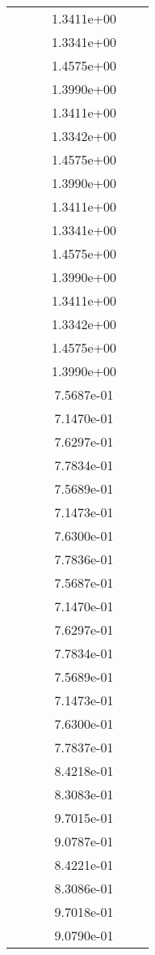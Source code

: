 \begin{xltabular}{\textwidth}{r|rS[table-format=1.3e+2]S[table-format=1.4e+2]S[table-format=1.4e+2]S[table-format=-1.5]}
&  &  & 1.3411e+00 & & \\
&  &  & 1.3341e+00 & & \\
&  &  & 1.4575e+00 & & \\
&  &  & 1.3990e+00 & & \\
&  &  & 1.3411e+00 & & \\
&  &  & 1.3342e+00 & & \\
&  &  & 1.4575e+00 & & \\
&  &  & 1.3990e+00 & & \\
&  &  & 1.3411e+00 & & \\
&  &  & 1.3341e+00 & & \\
&  &  & 1.4575e+00 & & \\
&  &  & 1.3990e+00 & & \\
&  &  & 1.3411e+00 & & \\
&  &  & 1.3342e+00 & & \\
&  &  & 1.4575e+00 & & \\
&  &  & 1.3990e+00 & & \\
&  &  & 7.5687e-01 & & \\
&  &  & 7.1470e-01 & & \\
&  &  & 7.6297e-01 & & \\
&  &  & 7.7834e-01 & & \\
&  &  & 7.5689e-01 & & \\
&  &  & 7.1473e-01 & & \\
&  &  & 7.6300e-01 & & \\
&  &  & 7.7836e-01 & & \\
&  &  & 7.5687e-01 & & \\
&  &  & 7.1470e-01 & & \\
&  &  & 7.6297e-01 & & \\
&  &  & 7.7834e-01 & & \\
&  &  & 7.5689e-01 & & \\
&  &  & 7.1473e-01 & & \\
&  &  & 7.6300e-01 & & \\
&  &  & 7.7837e-01 & & \\
&  &  & 8.4218e-01 & & \\
&  &  & 8.3083e-01 & & \\
&  &  & 9.7015e-01 & & \\
&  &  & 9.0787e-01 & & \\
&  &  & 8.4221e-01 & & \\
&  &  & 8.3086e-01 & & \\
&  &  & 9.7018e-01 & & \\
&  &  & 9.0790e-01 & & \\

\end{xltabular}
